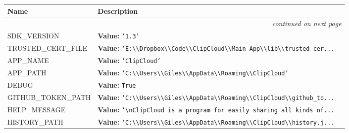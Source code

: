     \vspace{-1cm}
\hspace{\varindent}\begin{longtable}{|p{\varnamewidth}|p{\vardescrwidth}|l}
\cline{1-2}
\cline{1-2} \centering \textbf{Name} & \centering \textbf{Description}& \\
\cline{1-2}
\endhead\cline{1-2}\multicolumn{3}{r}{\small\textit{continued on next page}}\\\endfoot\cline{1-2}
\endlastfoot\raggedright S\-D\-K\-\_\-V\-E\-R\-S\-I\-O\-N\- & \raggedright \textbf{Value:} 
{\tt \texttt{'}\texttt{1.3}\texttt{'}}&\\
\cline{1-2}
\raggedright T\-R\-U\-S\-T\-E\-D\-\_\-C\-E\-R\-T\-\_\-F\-I\-L\-E\- & \raggedright \textbf{Value:} 
{\tt \texttt{'}\texttt{E:{\textbackslash}{\textbackslash}Dropbox{\textbackslash}{\textbackslash}Code{\textbackslash}{\textbackslash}ClipCloud{\textbackslash}{\textbackslash}Main App{\textbackslash}{\textbackslash}lib{\textbackslash}{\textbackslash}trusted-cer}\texttt{...}}&\\
\cline{1-2}
\raggedright A\-P\-P\-\_\-N\-A\-M\-E\- & \raggedright \textbf{Value:} 
{\tt \texttt{'}\texttt{ClipCloud}\texttt{'}}&\\
\cline{1-2}
\raggedright A\-P\-P\-\_\-P\-A\-T\-H\- & \raggedright \textbf{Value:} 
{\tt \texttt{'}\texttt{C:{\textbackslash}{\textbackslash}Users{\textbackslash}{\textbackslash}Giles{\textbackslash}{\textbackslash}AppData{\textbackslash}{\textbackslash}Roaming{\textbackslash}{\textbackslash}ClipCloud}\texttt{'}}&\\
\cline{1-2}
\raggedright D\-E\-B\-U\-G\- & \raggedright \textbf{Value:} 
{\tt True}&\\
\cline{1-2}
\raggedright G\-I\-T\-H\-U\-B\-\_\-T\-O\-K\-E\-N\-\_\-P\-A\-T\-H\- & \raggedright \textbf{Value:} 
{\tt \texttt{'}\texttt{C:{\textbackslash}{\textbackslash}Users{\textbackslash}{\textbackslash}Giles{\textbackslash}{\textbackslash}AppData{\textbackslash}{\textbackslash}Roaming{\textbackslash}{\textbackslash}ClipCloud{\textbackslash}{\textbackslash}github\_to}\texttt{...}}&\\
\cline{1-2}
\raggedright H\-E\-L\-P\-\_\-M\-E\-S\-S\-A\-G\-E\- & \raggedright \textbf{Value:} 
{\tt \texttt{'}\texttt{{\textbackslash}nClipCloud is a program for easily sharing all kinds of}\texttt{...}}&\\
\cline{1-2}
\raggedright H\-I\-S\-T\-O\-R\-Y\-\_\-P\-A\-T\-H\- & \raggedright \textbf{Value:} 
{\tt \texttt{'}\texttt{C:{\textbackslash}{\textbackslash}Users{\textbackslash}{\textbackslash}Giles{\textbackslash}{\textbackslash}AppData{\textbackslash}{\textbackslash}Roaming{\textbackslash}{\textbackslash}ClipCloud{\textbackslash}{\textbackslash}history.j}\texttt{...}}&\\

\end{longtable}
